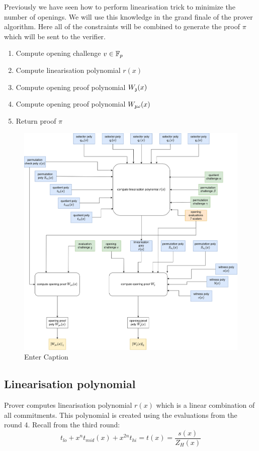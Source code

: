 Previously we have seen how to perform linearisation trick to minimize the number of openings. We will use this knowledge in the grand finale of the prover algorithm. Here all of the constraints will be combined to generate the proof $\pi$ which will be sent to the verifier.

\begin{enumerate}
    \item Compute opening challenge $v \in \mathbb{F}_p$
    \item Compute linearisation polynomial $r(x)$
    \item Compute opening proof polynomial $W_{\mathfrak{z}}(x)$
    \item Compute opening proof polynomial $W_{\mathfrak{z}\omega}(x)$
    \item Return proof $\pi$
\end{enumerate}

\begin{figure}[H]
    \centering
    \includegraphics[width=1\linewidth]{round-figures/round5/round5.drawio.png}
    \caption{Enter Caption}
    
\end{figure}

\subsection{Linearisation polynomial}
Prover computes linearisation polynomial $r(x)$ which is a linear combination of all commitments. This polynomial is created using the evaluations from the round 4. Recall from the third round: 
\begin{equation}\label{pseudo-linearisation-poly}
    t_{lo} + x^{n}t_{mid}(x) + x^{2n}t_{hi} = t(x) = \frac{s(x)}{Z_H(x)}
\end{equation}


